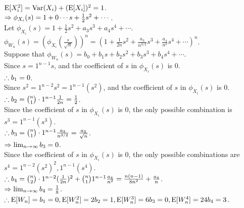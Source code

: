 \begin{pr}
$\mathrm{E}[X_i^2]=\mathrm{Var}(X_i)+(\mathrm{E}[X_i])^2=1$.\\
$\Rightarrow\phi_{X_i}(s)=1+0\cdots s+\frac12s^2+\cdots$.\\
Let $\phi_{X_i}(s)=1+\frac12s^2+a_3s^3+a_4s^4+\cdots$.\\
$\phi_{W_n}(s)=(\phi_{X_i}(\frac s{\sqrt n}))^n=(1+\frac1{2n}s^2+\frac{a_3}{n^{3/2}}s^3+\frac{a_4}{n^2}s^4+\cdots)^n$.\\
Suppose that $\phi_{W_n}(s)=b_0+b_1s+b_2s^2+b_3s^3+b_4s^4+\cdots$.\\
Since $s=1^{n-1}s$, and the coefficient of $s$ in $\phi_{X_i}(s)$ is $0$.\\
$\therefore b_1=0$.\\
Since $s^2=1^{n-2}s^2=1^{n-1}(s^2)$, and the coefficient of $s$ in $\phi_{X_i}(s)$ is $0$.\\
$\therefore b_2=\binom n1\cdot1^{n-1}\frac1{2n}=\frac12$.\\
Since the coefficient of $s$ in $\phi_{X_i}(s)$ is $0$, the only possible combination is $s^3=1^{n-1}(s^3)$.\\
$\therefore b_3=\binom n1\cdot1^{n-1}\frac{a_3}{n^{3/2}}=\frac{a_3}{\sqrt n}$.\\
$\Rightarrow\lim_{n\to\infty}b_3=0$.\\
Since the coefficient of $s$ in $\phi_{X_i}(s)$ is $0$, the only possible combinations are $s^4=1^{n-2}(s^2)^2, 1^{n-1}(s^4)$.\\
$\therefore b_4=\binom n2\cdot1^{n-2}(\frac1{2n})^2+\binom n11^{n-1}\frac{a_4}{n^2}=\frac{n(n-1)}{8n^2}+\frac{a_4}n$.\\
$\Rightarrow\lim_{n\to\infty}b_4=\frac18$.\\
$\therefore\mathrm{E}[W_n]=b_1=0, \mathrm{E}[W_n^2]=2b_2=1, \mathrm{E}[W_n^3]=6b_3=0, \mathrm{E}[W_n^4]=24b_4=3$.
\end{pr}
